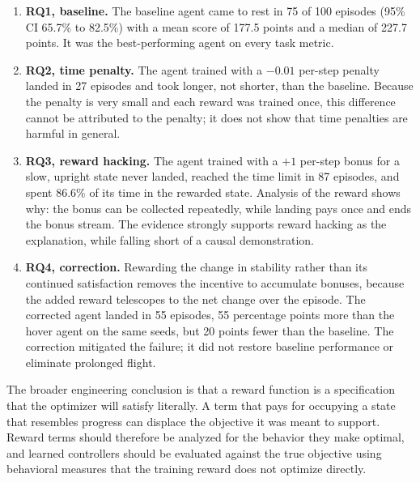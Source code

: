\documentclass[11pt,a4paper]{article}
\begin{document}
\begin{enumerate}
  \item \textbf{RQ1, baseline.} The baseline agent came to rest in 75 of 100 episodes (95\% CI 65.7\% to 82.5\%) with a mean score of 177.5 points and a median of 227.7 points. It was the best-performing agent on every task metric.
  \item \textbf{RQ2, time penalty.} The agent trained with a $-0.01$ per-step penalty landed in 27 episodes and took longer, not shorter, than the baseline. Because the penalty is very small and each reward was trained once, this difference cannot be attributed to the penalty; it does not show that time penalties are harmful in general.
  \item \textbf{RQ3, reward hacking.} The agent trained with a $+1$ per-step bonus for a slow, upright state never landed, reached the time limit in 87 episodes, and spent 86.6\% of its time in the rewarded state. Analysis of the reward shows why: the bonus can be collected repeatedly, while landing pays once and ends the bonus stream. The evidence strongly supports reward hacking as the explanation, while falling short of a causal demonstration.
  \item \textbf{RQ4, correction.} Rewarding the change in stability rather than its continued satisfaction removes the incentive to accumulate bonuses, because the added reward telescopes to the net change over the episode. The corrected agent landed in 55 episodes, 55 percentage points more than the hover agent on the same seeds, but 20 points fewer than the baseline. The correction mitigated the failure; it did not restore baseline performance or eliminate prolonged flight.
\end{enumerate}

The broader engineering conclusion is that a reward function is a specification that the optimizer will satisfy literally. A term that pays for occupying a state that resembles progress can displace the objective it was meant to support. Reward terms should therefore be analyzed for the behavior they make optimal, and learned controllers should be evaluated against the true objective using behavioral measures that the training reward does not optimize directly.

\end{document}
